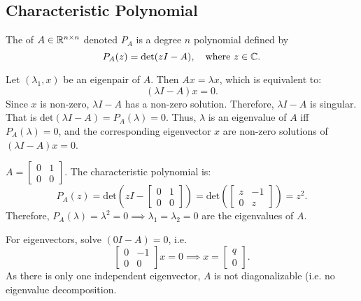 \documentclass[../main/main.tex]{subfiles}
\begin{document}
\subsection{Characteristic Polynomial}
\begin{definition}
	The  of $A\in \mathbb{R}^{n\times n}$ denoted $P_A$ is a degree $n$ polynomial defined by \[
		P_A(z)=\text{det}(zI-A),\quad \text{where }z\in\mathbb{C}
	.\] 
\end{definition}
Let $\left( \lambda_1,x \right) $ be an eigenpair of $A$. Then $Ax=\lambda x$, which is equivalent to: \[
	\left( \lambda I-A \right) x=0
.\] 
Since $x$ is non-zero, $\lambda I-A$ has a non-zero solution. Therefore,  $\lambda I-A$ is singular. That is $\text{det}(\lambda I-A)=P_A(\lambda)=0$. Thus, $\lambda$ is an eigenvalue of $A$ iff $P_A(\lambda)=0$, and the corresponding eigenvector  $x$ are non-zero solutions of $\left( \lambda I-A \right) x=0$.
\begin{example}
	$A=\begin{bmatrix} 0&1\\0 &0 \end{bmatrix} $. The characteristic polynomial is: \[
		P_A(z)=\text{det}\left(zI-\begin{bmatrix} 0&1\\0&0 \end{bmatrix} \right)=\text{det}\left( \begin{bmatrix} z&-1\\0&z \end{bmatrix}  \right) =z^2
	.\] Therefore, $P_A(\lambda)=\lambda^2=0\implies \lambda_1=\lambda_2=0$ are the eigenvalues of $A$.
	
	For eigenvectors, solve $(0I-A)=0$, i.e. \[
	\begin{bmatrix} 0&-1\\0&0 \end{bmatrix} x=0\implies x=\begin{bmatrix} q\\0 \end{bmatrix} 
.\] As there is only one independent eigenvector, $A$ is not diagonalizable (i.e. no eigenvalue decomposition.
\end{example}
\end{document}
